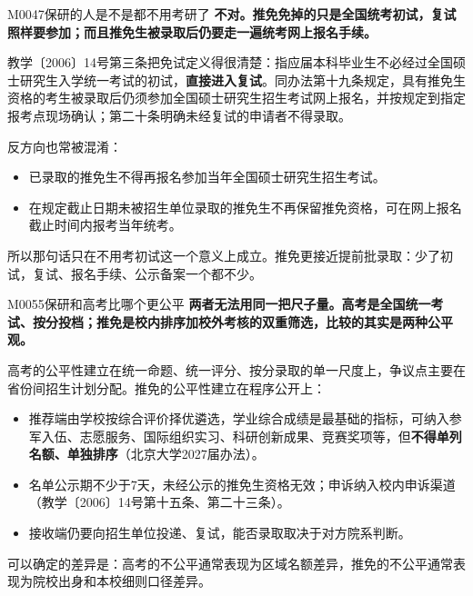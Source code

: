 \begin{qa}{M0047}{保研的人是不是都不用考研了}
\textbf{不对。推免免掉的只是全国统考初试，复试照样要参加；而且推免生被录取后仍要走一遍统考网上报名手续。}

教学〔2006〕14号第三条把免试定义得很清楚：指应届本科毕业生不必经过全国硕士研究生入学统一考试的初试，\textbf{直接进入复试}。同办法第十九条规定，具有推免生资格的考生被录取后仍须参加全国硕士研究生招生考试网上报名，并按规定到指定报考点现场确认；第二十条明确未经复试的申请者不得录取。

反方向也常被混淆：

\begin{itemize}
  \item 已录取的推免生不得再报名参加当年全国硕士研究生招生考试。
  \item 在规定截止日期未被招生单位录取的推免生不再保留推免资格，可在网上报名截止时间内报考当年统考。
\end{itemize}

所以那句话只在不用考初试这一个意义上成立。推免更接近提前批录取：少了初试，复试、报名手续、公示备案一个都不少。
\end{qa}

\begin{qa}{M0055}{保研和高考比哪个更公平}
\textbf{两者无法用同一把尺子量。高考是全国统一考试、按分投档；推免是校内排序加校外考核的双重筛选，比较的其实是两种公平观。}

高考的公平性建立在统一命题、统一评分、按分录取的单一尺度上，争议点主要在省份间招生计划分配。推免的公平性建立在程序公开上：

\begin{itemize}
  \item 推荐端由学校按综合评价择优遴选，学业综合成绩是最基础的指标，可纳入参军入伍、志愿服务、国际组织实习、科研创新成果、竞赛奖项等，但\textbf{不得单列名额、单独排序}（北京大学2027届办法）。
  \item 名单公示期不少于7天，未经公示的推免生资格无效；申诉纳入校内申诉渠道（教学〔2006〕14号第十五条、第二十三条）。
  \item 接收端仍要向招生单位投递、复试，能否录取取决于对方院系判断。
\end{itemize}

可以确定的差异是：高考的不公平通常表现为区域名额差异，推免的不公平通常表现为院校出身和本校细则口径差异。
\end{qa}

